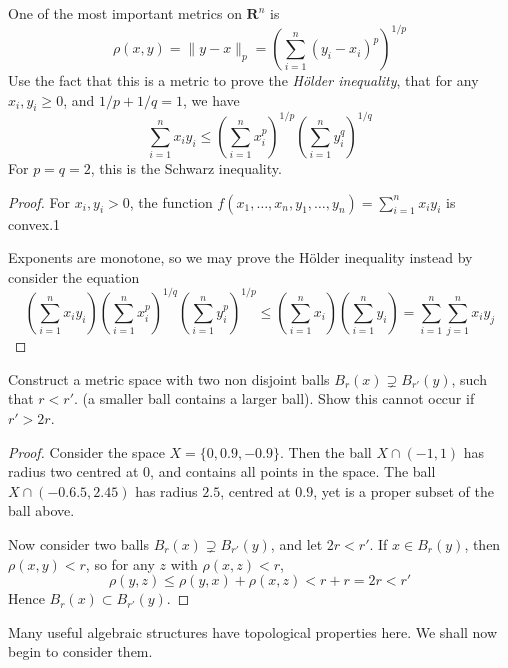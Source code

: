 \begin{exercise}
    One of the most important metrics on $\mathbf{R}^n$ is
    \[ \rho(x,y) = \|y - x\|_p = \left( \sum_{i = 1}^n (y_i - x_i)^p \right)^{1/p} \]
    Use the fact that this is a metric to prove the {\it H\"{o}lder inequality}, that for any $x_i,y_i \geq 0$, and $1/p + 1/q = 1$, we have
    \[ \sum_{i = 1}^n x_iy_i \leq \left( \sum_{i = 1}^n x_i^p \right)^{1/p} \left( \sum_{i = 1}^n y_i^q \right)^{1/q} \]
    For $p = q = 2$, this is the Schwarz inequality.
\end{exercise}
\begin{proof}
    For $x_i,y_i > 0$, the function $f(x_1, \dots, x_n, y_1, \dots, y_n) = \sum_{i = 1}^n x_iy_i$ is convex.1

    Exponents are monotone, so we may prove the H\"{o}lder inequality instead by consider the equation
    \[ \left(\sum_{i = 1}^n x_iy_i \right) \left( \sum_{i = 1}^n x_i^p \right)^{1/q} \left( \sum_{i = 1}^n y_i^p \right)^{1/p} \leq \left( \sum_{i = 1}^n x_i \right) \left( \sum_{i = 1}^n y_i \right) = \sum_{i = 1}^n \sum_{j = 1}^n x_iy_j \]
\end{proof}

\begin{exercise}
    Construct a metric space with two non disjoint balls $B_r(x) \supsetneq B_{r'}(y)$, such that $r < r'$. (a smaller ball contains a larger ball). Show this cannot occur if $r' > 2r$.
\end{exercise}
\begin{proof}
    Consider the space $X = \{ 0, 0.9, -0.9 \}$. Then the ball $X \cap (-1,1)$ has radius two centred at 0, and contains all points in the space. The ball $X \cap (-0.6.5,2.45)$ has radius $2.5$, centred at $0.9$, yet is a proper subset of the ball above.

    Now consider two balls $B_r(x) \supsetneq B_{r'}(y)$, and let $2r < r'$. If $x \in B_r(y)$, then $\rho(x,y) < r$, so for any $z$ with $\rho(x,z) < r$,
    \[ \rho(y,z) \leq \rho(y,x) + \rho(x,z) < r + r = 2r < r' \]
    Hence $B_r(x) \subset B_{r'}(y)$.
\end{proof}

Many useful algebraic structures have topological properties here. We shall now begin to consider them.

